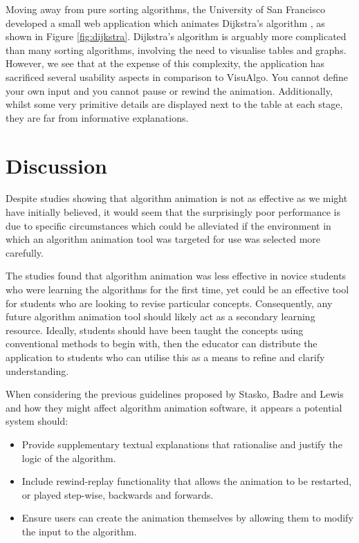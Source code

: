 \documentclass{l4proj}
\begin{document}
Moving away from pure sorting algorithms, the University of San Francisco developed a small web application which animates Dijkstra's algorithm \cite{dijkstra}, as shown in Figure \ref{fig:dijkstra}. Dijkstra's algorithm is arguably more complicated than many sorting algorithms, involving the need to visualise tables and graphs. However, we see that at the expense of this complexity, the application has sacrificed several usability aspects in comparison to VisuAlgo. You cannot define your own input and you cannot pause or rewind the animation. Additionally, whilst some very primitive details are displayed next to the table at each stage, they are far from informative explanations. 

\section{Discussion}
Despite studies showing that algorithm animation is not as effective as we might have initially believed, it would seem that the surprisingly poor performance is due to specific circumstances which could be alleviated if the environment in which an algorithm animation tool was targeted for use was selected more carefully. 

The studies found that algorithm animation was less effective in novice students who were learning the algorithms for the first time, yet could be an effective tool for students who are looking to revise particular concepts. Consequently, any future algorithm animation tool should likely act as a secondary learning resource. Ideally, students should have been taught the concepts using conventional methods to begin with, then the educator can distribute the application to students who can utilise this as a means to refine and clarify understanding.

When considering the previous guidelines proposed by Stasko, Badre and Lewis and how they might affect algorithm animation software, it appears a potential system should:
\begin{itemize}
\item Provide supplementary textual explanations that rationalise and justify the logic of the algorithm.
\item Include rewind-replay functionality that allows the animation to be restarted, or played step-wise, backwards and forwards.
\item Ensure users can create the animation themselves by allowing them to modify the input to the algorithm.
\end{itemize}
\end{document}
